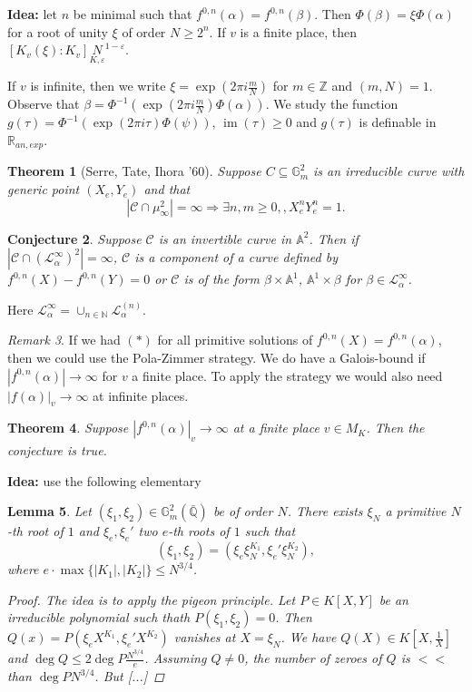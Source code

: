 \documentclass[12pt]{article}
\theoremstyle{darkgreentheorem}
\newtheorem{thm}{Theorem}[section]
\newtheorem{lm}[thm]{Lemma}
\newtheorem{conj}[thm]{Conjecture}
\theoremstyle{darkbluedefinition}
\theoremstyle{darkredexample}
\theoremstyle{remark}
\newtheorem{rem}[thm]{Remark}
\newcommand{\N}{\mathbb{N}}
\newcommand{\Z}{\mathbb{Z}}
\newcommand{\Q}{\mathbb{Q}}
\newcommand{\R}{\mathbb{R}}
\newcommand{\1}{\mathbbm{1}}
\newcommand{\Gm}{\mathbb{G}_{m}}
\newcommand{\bbA}{\mathbb{A}}
\newcommand{\calC}{\mathcal{C}}
\renewcommand{\L}{\mathcal{L}}
\DeclareMathOperator{\im}{im}
\newcommand{\sub}{\subseteq}
\begin{document}
\textbf{Idea:} let $n$ be minimal such that $f^{0,n}(\alpha)=f^{0,n}(\beta)$.
Then $\Phi(\beta)=\xi \Phi(\alpha)$ for a root of unity $\xi$ of order $N\geqslant 2^{n}$.
If $v$ is a finite place, then $[K_{v}(\xi):K_{v}]\underset{K,\varepsilon} N^{1-\varepsilon}$.

If $v$ is infinite, then we write $\xi=\exp(2\pi i\frac{m}{N})$ for $m\in \Z$ and $(m,N)=1$.
Observe that $\beta=\Phi^{-1}(\exp(2\pi i\frac{m}{N})\Phi(\alpha))$.
We study the function $g(\tau)=\Phi^{-1}(\exp(2\pi i\tau)\Phi(\psi))$, $\im(\tau)\geqslant 0$ and $g(\tau)$ is definable in $\R_{an,exp}$.

\begin{thm}[Serre, Tate, Ihora '60]
    Suppose $C\sub\Gm^{2}$ is an irreducible curve with generic point $(X_{e},Y_{e})$ and that
    \[ |\calC\cap \mu_{\infty}^{2} |=\infty \Rightarrow \exists n,m\geqslant 0,,X_{e}^{n}Y_{e}^{n}=1.\]
\end{thm}

\begin{conj}
    Suppose $\calC$ is an invertible curve in $\bbA^{2}$.
    Then if $|\calC\cap (\L_{\alpha}^{\infty})^{2}|=\infty$, $\calC$ is a component of a curve defined by $f^{0,n}(X)-f^{0,n}(Y)=0$ or $\calC$ is of the form $\beta\times \bbA^{1}$, $\bbA^{1}\times \beta$ for $\beta\in\L_{\alpha}^{\infty}$.
\end{conj}

Here $\L_{\alpha}^{\infty}=\cup_{n\in\N}\L_{\alpha}^{(n)}$.

\begin{rem}
    If we had $(*)$ for all primitive solutions of $f^{0,n}(X)=f^{0,n}(\alpha)$, then we could use the Pola-Zimmer strategy.
    We do have a Galois-bound if $|f^{0,n}(\alpha)|\to \infty$ for $v$ a finite place.
    To apply the strategy we would also need $|f(\alpha)|_{v}\to \infty$ at infinite places.
\end{rem}

\begin{thm}
    Suppose $|f^{0,n}(\alpha)|_{v}\to \infty$ at a finite place $v\in M_{K}$.
    Then the conjecture is true.
\end{thm}

\textbf{Idea:} use the following elementary
\begin{lm}
    Let $(\xi_{1},\xi_{2})\in \Gm^{2}(\bar{\Q})$ be of order $N$.
    There exists $\xi_{N}$ a primitive $N$-th root of $1$ and $\xi_{e},\xi_{e}'$ two $e$-th roots of $1$ such that
    \[ (\xi_{1},\xi_{2})=(\xi_{e}\xi_{N}^{K_{1}},\xi_{e}'\xi_{N}^{K_{2}}), \]
    where $e\cdot \max\{|K_{1}|,|K_{2}|\}\leqslant N^{3/4}$.
    \begin{proof}
	The idea is to apply the pigeon principle.
	Let $P\in K[X,Y]$ be an irreducible polynomial such thath $P(\xi_{1},\xi_{2})=0$.
	Then $Q(x)=P(\xi_{e}X^{K_{1}},\xi_{e}'X^{K_{2}})$ vanishes at $X=\xi_{N}$.
	We have $Q(X)\in K[X,\frac{1}{X}]$ and $\deg{Q}\leqslant 2\deg{P}\frac{N^{3/4}}{e}$.
	Assuming $Q\neq 0$, the number of zeroes of $Q$ is $<<$ than $\deg{P}N^{3/4}$.
	But [...]
    \end{proof}
\end{lm}
\end{document}
